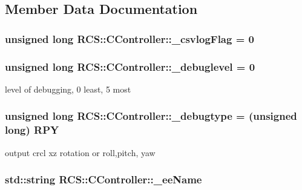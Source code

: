 \subsection{Member Data Documentation}
\hypertarget{structRCS_1_1CController_ab52a91aa3bfa1f56b527217f09c66912}{
\subsubsection[{\-\_\-csvlog\-Flag}]{\setlength{\rightskip}{0pt plus 5cm}unsigned long R\-C\-S\-::\-C\-Controller\-::\-\_\-csvlog\-Flag = 0\hspace{0.3cm}{\ttfamily [static]}}}\label{structRCS_1_1CController_ab52a91aa3bfa1f56b527217f09c66912}
\hypertarget{structRCS_1_1CController_a1e7f92c361c961fae03b08986bc19a16}{
\subsubsection[{\-\_\-debuglevel}]{\setlength{\rightskip}{0pt plus 5cm}unsigned long R\-C\-S\-::\-C\-Controller\-::\-\_\-debuglevel = 0\hspace{0.3cm}{\ttfamily [static]}}}\label{structRCS_1_1CController_a1e7f92c361c961fae03b08986bc19a16}
level of debugging, 0 least, 5 most \hypertarget{structRCS_1_1CController_ae4ff5cead0f30ebf8dcbc850b342afc4}{
\subsubsection[{\-\_\-debugtype}]{\setlength{\rightskip}{0pt plus 5cm}unsigned long R\-C\-S\-::\-C\-Controller\-::\-\_\-debugtype = (unsigned long) {\bf R\-P\-Y}\hspace{0.3cm}{\ttfamily [static]}}}\label{structRCS_1_1CController_ae4ff5cead0f30ebf8dcbc850b342afc4}
output crcl xz rotation or roll,pitch, yaw \hypertarget{structRCS_1_1CController_af21d09514563cd2bb2d0d0a5b001d205}{
\subsubsection[{\-\_\-ee\-Name}]{\setlength{\rightskip}{0pt plus 5cm}std\-::string R\-C\-S\-::\-C\-Controller\-::\-\_\-ee\-Name}}\label{structRCS_1_1CController_af21d09514563cd2bb2d0d0a5b001d205}
